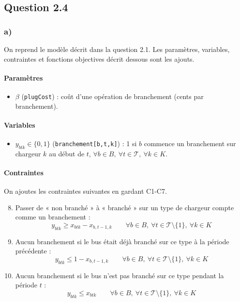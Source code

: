 \documentclass{article}
\begin{document}
\subsection*{Question 2.4}
\subsubsection*{a)}
On reprend le modèle décrit dans la question 2.1. Les paramètres, variables, contraintes et fonctions objectives décrit dessous sont les ajouts.  

\paragraph{Paramètres}
\begin{itemize}
  \item $\beta$ (\texttt{plugCost}) : coût d'une opération de branchement (cents par branchement).
\end{itemize}

\paragraph{Variables}
\begin{itemize}
  \item $y_{btk} \in \{0,1\}$ (\texttt{branchement[b,t,k]}) : 1 si $b$ commence un branchement sur chargeur $k$ au début de $t$, $\forall b \in B,\ \forall t \in \mathcal{T},\ \forall k \in K$.
\end{itemize}

\paragraph{Contraintes}
On ajoutes les contraintes suivantes en gardant C1-C7. 
\begin{enumerate}
  \setcounter{enumi}{7}
  \item Passer de « non branché » à « branché » sur un type de chargeur compte comme un branchement :
  \[ y_{btk} \geq x_{btk} - x_{b,t-1,k} \qquad \forall b \in B,\ \forall t \in \mathcal{T} \setminus \{1\},\ \forall k \in K \]

  \item Aucun branchement si le bus était déjà branché sur ce type à la période précédente :
  \[ y_{btk} \leq 1 - x_{b,t-1,k} \qquad \forall b \in B,\ \forall t \in \mathcal{T} \setminus \{1\},\ \forall k \in K \]

  \item Aucun branchement si le bus n'est pas branché sur ce type pendant la période $t$ :
  \[ y_{btk} \leq x_{btk} \qquad \forall b \in B,\ \forall t \in \mathcal{T} \setminus \{1\},\ \forall k \in K \]
\end{enumerate}
\end{document}
